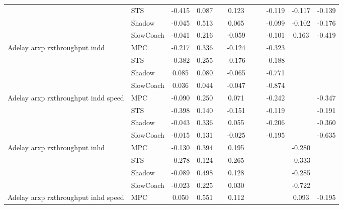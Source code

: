 \begin{tabular}{|l|l|*{9}{c|}}
                              & STS &   -0.415 &     0.087 &        &  0.123 &     &     &  -0.119 &  -0.117 &   -0.139 \\
                              & Shadow &   -0.045 &     0.513 &        &  0.065 &     &     &  -0.099 &  -0.102 &   -0.176 \\
                              & SlowCoach &   -0.041 &     0.216 &        & -0.059 &     &     &  -0.101 &   0.163 &   -0.419 \\
\midrule
Adelay arxp rxthroughput indd    & MPC &   -0.217 &     0.336 &        & -0.124 &     &     &  -0.323 &      &       \\
                              & STS &   -0.382 &     0.255 &        & -0.176 &     &     &  -0.188 &      &       \\
                              & Shadow &    0.085 &     0.080 &        & -0.065 &     &     &  -0.771 &      &       \\
                              & SlowCoach &    0.036 &     0.044 &        & -0.047 &     &     &  -0.874 &      &       \\
\midrule
Adelay arxp rxthroughput indd speed    & MPC &   -0.090 &     0.250 &        &  0.071 &     &     &  -0.242 &      &   -0.347 \\
                              & STS &   -0.398 &     0.140 &        & -0.151 &     &     &  -0.119 &      &   -0.191 \\
                              & Shadow &   -0.043 &     0.336 &        &  0.055 &     &     &  -0.206 &      &   -0.360 \\
                              & SlowCoach &   -0.015 &     0.131 &        & -0.025 &     &     &  -0.195 &      &   -0.635 \\
\midrule
Adelay arxp rxthroughput inhd    & MPC &   -0.130 &     0.394 &        &  0.195 &     &     &      &  -0.280 &       \\
                              & STS &   -0.278 &     0.124 &        &  0.265 &     &     &      &  -0.333 &       \\
                              & Shadow &   -0.089 &     0.498 &        &  0.128 &     &     &      &  -0.285 &       \\
                              & SlowCoach &   -0.023 &     0.225 &        &  0.030 &     &     &      &  -0.722 &       \\
\midrule
Adelay arxp rxthroughput inhd speed    & MPC &    0.050 &     0.551 &        &  0.112 &     &     &      &   0.093 &   -0.195 \\

\end{tabular}
